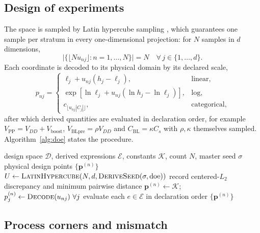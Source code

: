\documentclass[11pt,a4paper]{article}
\newcommand{\Vblpre}{V_{\mathrm{BLpre}}}
\newcommand{\Cs}{C_{s}}
\newcommand{\Cbl}{C_{\mathrm{BL}}}
\begin{document}
\subsection{Design of experiments}

The space is sampled by Latin hypercube sampling
\cite{mckay1979lhs,borisut2023alhs,phromphan2024lhs}, which guarantees one sample
per stratum in every one-dimensional projection: for $N$ samples in $d$
dimensions,
\begin{equation}
\bigl|\{\lfloor N u_{nj}\rfloor : n=1,\dots,N\}\bigr| = N
\quad \forall\, j\in\{1,\dots,d\}.
\label{eq:lhs}
\end{equation}
Each coordinate is decoded to its physical domain by its declared scale,
\begin{equation}
p_{nj} =
\begin{cases}
\ell_j + u_{nj}(h_j-\ell_j), & \text{linear},\\
\exp[\ln\ell_j + u_{nj}(\ln h_j - \ln\ell_j)], & \text{log},\\
c_{\lfloor u_{nj}|C_j|\rfloor}, & \text{categorical},
\end{cases}
\label{eq:decode}
\end{equation}
after which derived quantities are evaluated in declaration order, for example
$V_{\mathrm{PP}}=V_{DD}+V_{\mathrm{boost}}$, $\Vblpre=\rho V_{DD}$ and
$\Cbl=\kappa\Cs$ with $\rho,\kappa$ themselves sampled. Algorithm~\ref{alg:doe}
states the procedure.

\begin{algorithm}[!ht]
\caption{Configuration-driven sampling and decoding}
\label{alg:doe}
\begin{algorithmic}[1]
\Require design space $\mathcal{D}$, derived expressions $\mathcal{E}$, constants
$\mathcal{K}$, count $N$, master seed $\sigma$
\Ensure physical design points $\{\mathbf{p}^{(n)}\}$
\State $U \gets \textsc{LatinHypercube}(N,d,\textsc{DeriveSeed}(\sigma,\text{doe}))$
\State record centered-$L_2$ discrepancy and minimum pairwise distance
  \State $\mathbf{p}^{(n)} \gets \mathcal{K}$;
  \ $p^{(n)}_j \gets \textsc{Decode}(u_{nj})\ \forall j$
  \State evaluate each $e\in\mathcal{E}$ in declaration order
\EndFor
\State \Return $\{\mathbf{p}^{(n)}\}$
\end{algorithmic}
\end{algorithm}

\subsection{Process corners and mismatch}
\end{document}

